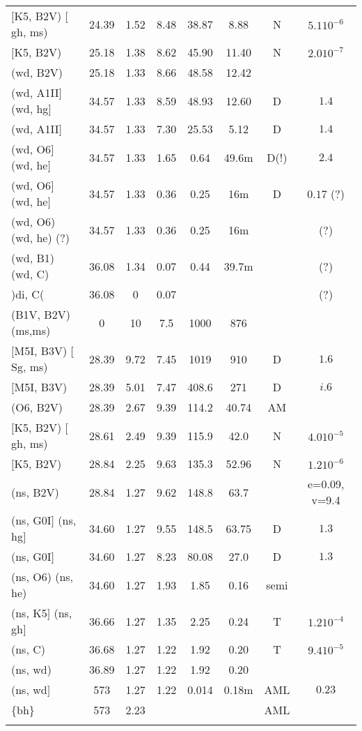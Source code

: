 \documentclass{article}
\begin{document}
\begin{table}
\begin{tabular}{p{4cm}ccccccc}
$[$K5, B2V) $[$gh, ms)	& 24.39	& 1.52	& 8.48	& 38.87	& 8.88	& N	& $5.1 10^{-6}$		\\
$[$K5, B2V)	 	& 25.18	& 1.38	& 8.62	& 45.90	& 11.40	& N	& $2.0 10^{-7}$		\\
(wd, B2V)	 	& 25.18	& 1.33	& 8.66	& 48.58	& 12.42	&	&			\\
(wd, A1II$]$ (wd, hg$]$	& 34.57	& 1.33	& 8.59	& 48.93	& 12.60	& D	& $1.4$			\\
(wd, A1II$]$	 	& 34.57	& 1.33	& 7.30	& 25.53	& 5.12	& D	& $1.4$			\\
(wd, O6$]$ (wd, he$]$	& 34.57	& 1.33	& 1.65	& 0.64	& 49.6m	& D(!)	& $2.4$			\\
(wd, O6$]$ (wd, he$]$	& 34.57	& 1.33	& 0.36	& 0.25	& 16m	& D	& $0.17$ (?)		\\
(wd, O6) (wd, he) (?)	& 34.57	& 1.33 	& 0.36	& 0.25 	& 16m	&	& (?)			\\
(wd, B1) (wd, C) 	& 36.08	& 1.34	& 0.07	& 0.44	& 39.7m	&	& (?)			\\
)di, C( 	 	& 36.08	& 0	& 0.07	&	&	&	& (?)			\\ \hline
(B1V, B2V) (ms,ms)   	& 0	& 10	& 7.5	& 1000	& 876	&	&			\\
$[$M5I, B3V) $[$Sg, ms)	& 28.39	& 9.72	& 7.45	& 1019	& 910	& D	& $1.6$			\\
$[$M5I, B3V)	 	& 28.39	& 5.01	& 7.47	& 408.6	& 271	& D	& $i.6$			\\
(O6, B2V)	 	& 28.39	& 2.67	& 9.39	& 114.2	& 40.74	& AM	&			\\
$[$K5, B2V) $[$gh, ms)	& 28.61	& 2.49	& 9.39	& 115.9	& 42.0	& N	& $4.0 10^{-5}$		\\
$[$K5, B2V)	 	& 28.84	& 2.25	& 9.63	& 135.3	& 52.96	& N	& $1.2 10^{-6}$		\\
(ns, B2V)	 	& 28.84	& 1.27	& 9.62	& 148.8	& 63.7	&	& e=0.09, v=9.4		\\
(ns, G0I$]$ (ns, hg$]$	& 34.60	& 1.27	& 9.55	& 148.5	& 63.75	& D	& $1.3$			\\
(ns, G0I$]$	 	& 34.60	& 1.27	& 8.23	& 80.08	& 27.0	& D	& $1.3$			\\
(ns, O6) (ns, he)	& 34.60	& 1.27	& 1.93	& 1.85	& 0.16	& semi	&			\\
(ns, K5$]$ (ns, gh$]$	& 36.66	& 1.27	& 1.35	& 2.25	& 0.24	& T	& $1.2 10^{-4}$		\\
(ns, C)		 	& 36.68	& 1.27	& 1.22	& 1.92	& 0.20	& T	& $9.4 10^{-5}$		\\
(ns, wd)	 	& 36.89	& 1.27	& 1.22	& 1.92	& 0.20	&	&			\\
(ns, wd$]$	 	& 573	& 1.27	& 1.22	& 0.014	& 0.18m	& AML	& $0.23$		\\
\{bh\}		 	& 573	& 2.23  & 	&	&	& AML	&			\\
		 	& 	& 	&	&	&	&	&			\\ \hline
\end{tabular}
\end{table}
\end{document}
